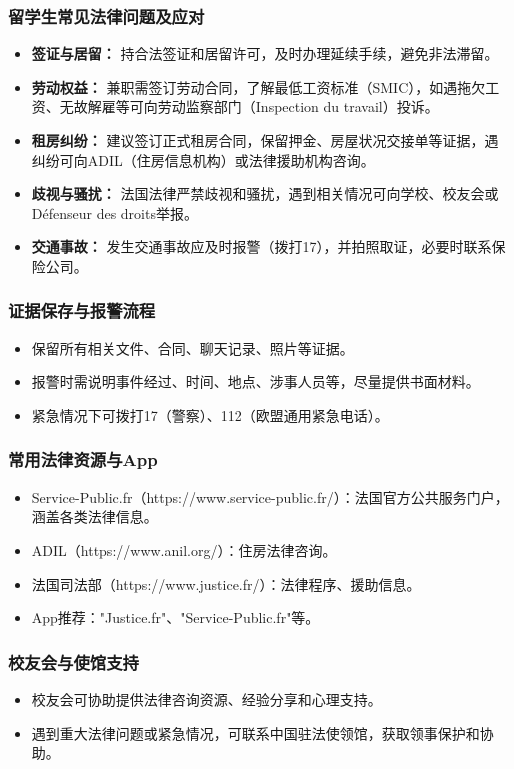 \subsubsection{留学生常见法律问题及应对}
\begin{itemize}
    \item \textbf{签证与居留：} 持合法签证和居留许可，及时办理延续手续，避免非法滞留。
    \item \textbf{劳动权益：} 兼职需签订劳动合同，了解最低工资标准（SMIC），如遇拖欠工资、无故解雇等可向劳动监察部门（Inspection du travail）投诉。
    \item \textbf{租房纠纷：} 建议签订正式租房合同，保留押金、房屋状况交接单等证据，遇纠纷可向ADIL（住房信息机构）或法律援助机构咨询。
    \item \textbf{歧视与骚扰：} 法国法律严禁歧视和骚扰，遇到相关情况可向学校、校友会或Défenseur des droits举报。
    \item \textbf{交通事故：} 发生交通事故应及时报警（拨打17），并拍照取证，必要时联系保险公司。
\end{itemize}

\subsubsection{证据保存与报警流程}
\begin{itemize}
    \item 保留所有相关文件、合同、聊天记录、照片等证据。
    \item 报警时需说明事件经过、时间、地点、涉事人员等，尽量提供书面材料。
    \item 紧急情况下可拨打17（警察）、112（欧盟通用紧急电话）。
\end{itemize}

\subsubsection{常用法律资源与App}
\begin{itemize}
    \item Service-Public.fr（https://www.service-public.fr/）：法国官方公共服务门户，涵盖各类法律信息。
    \item ADIL（https://www.anil.org/）：住房法律咨询。
    \item 法国司法部（https://www.justice.fr/）：法律程序、援助信息。
    \item App推荐："Justice.fr"、"Service-Public.fr"等。
\end{itemize}

\subsubsection{校友会与使馆支持}
\begin{itemize}
    \item 校友会可协助提供法律咨询资源、经验分享和心理支持。
    \item 遇到重大法律问题或紧急情况，可联系中国驻法使领馆，获取领事保护和协助。
\end{itemize}
